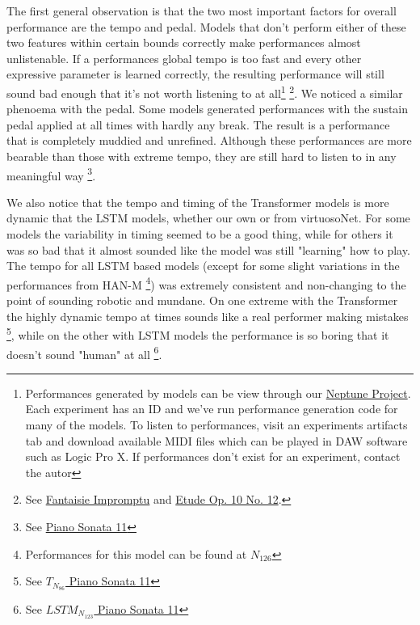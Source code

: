 The first general observation is that the two most important factors for overall performance are the tempo and pedal. Models that don't perform either of these two features within certain bounds correctly make performances almost unlistenable. If a performances global tempo is too fast and every other expressive parameter is learned correctly, the resulting performance will still sound bad enough that it's not worth listening to at all\footnote{Performances generated by models can be view through our \href{https://ui.neptune.ai/richt3211/thesis/experiments}{Neptune Project}. Each experiment has an ID and we've run performance generation code for many of the models. To listen to performances, visit an experiments artifacts tab and download available MIDI files which can be played in DAW software such as Logic Pro X. If performances don't exist for an experiment, contact the autor} \footnote{See \href{https://ui.neptune.ai/richt3211/thesis/e/THESIS-86/artifacts}{ Fantaisie Impromptu} and \href{https://ui.neptune.ai/richt3211/thesis/e/THESIS-126/artifacts}{ Etude Op. 10 No. 12}.}. We noticed a similar phenoema with the pedal. Some models generated performances with the sustain pedal applied at all times with hardly any break. The result is a performance that is completely muddied and unrefined. Although these performances are more bearable than those with extreme tempo, they are still hard to listen to in any meaningful way \footnote{See \href{https://ui.neptune.ai/richt3211/thesis/e/THESIS-125/artifacts}{ Piano Sonata 11} }. 

\newcommand{\lm}[1]{$LSTM_{N_{#1}}$}

We also notice that the tempo and timing of the Transformer models is more dynamic that the LSTM models, whether our own or from virtuosoNet. For some models the variability in timing seemed to be a good thing, while for others it was so bad that it almost sounded like the model was still "learning" how to play. The tempo for all LSTM based models (except for some slight variations in the performances from HAN-M \footnote{Performances for this model can be found at \href{https://ui.neptune.ai/richt3211/thesis/e/THESIS-162/artifacts}{$N_{126}$}}) was extremely consistent and non-changing to the point of sounding robotic and mundane. On one extreme with the Transformer the highly dynamic tempo at times sounds like a real performer making mistakes \footnote{See \href{https://ui.neptune.ai/richt3211/thesis/e/THESIS-86/artifacts}{$T_{N_{86}}$ Piano Sonata 11}}, while on the other with LSTM models the performance is so boring that it doesn't sound "human" at all \footnote{See \href{https://ui.neptune.ai/richt3211/thesis/e/THESIS-123/artifacts}{\lm{123} Piano Sonata 11}}. 


